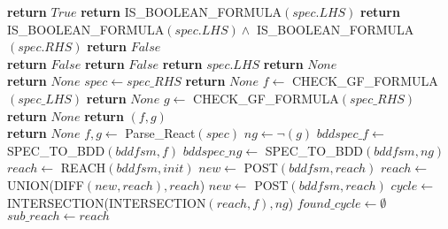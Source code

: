 \documentclass{article}
\begin{document}
\begin{algorithmic}

                 \State \textbf{return }$ True$
      \EndIf  
                 \State \textbf{return } IS\_BOOLEAN\_FORMULA$(spec.LHS)$
      \EndIf 
                 \State \textbf{return } IS\_BOOLEAN\_FORMULA$(spec.LHS) \land $ IS\_BOOLEAN\_FORMULA$(spec.RHS)$
      \EndIf 
      \State \textbf{return }$False$
\EndFunction
\\
                 \State \textbf{return }$ False$
      \EndIf  
                 \State \textbf{return }$ False$
     \EndIf 
             \State \textbf{return }$ spec.LHS$
      \Else
       \State \textbf{return }$ None$
      \EndIf 
\EndFunction
\\
        \State \textbf{return }$ None$
       \EndIf 
  \State $spec \leftarrow spec\_RHS$
        \State \textbf{return }$ None$
       \EndIf  
   \State $f \leftarrow$ CHECK\_GF\_FORMULA$(spec\_LHS)$
        \State \textbf{return }$ None$
       \EndIf  
   \State $g \leftarrow$ CHECK\_GF\_FORMULA$(spec\_RHS)$
        \State \textbf{return }$ None$
       \EndIf  
\State \textbf{return }$ (f, g)$
\EndFunction
\\
        \State \textbf{return }$ None$
\Else
     \State $ f, g \leftarrow $ Parse\_React$(spec)$  
     \State $ng \leftarrow \neg(g)$
     \State $bddspec\_f \leftarrow$ SPEC\_TO\_BDD$(bddfsm, f)$
     \State $bddspec\_ng \leftarrow$ SPEC\_TO\_BDD$(bddfsm, ng)$
     \State $reach \leftarrow$ REACH$(bddfsm, init)$
     \State $new\leftarrow$ POST$(bddfsm, reach)$
           \State $reach\leftarrow$ UNION(DIFF$(new, reach),reach$)
           \State $new\leftarrow$ POST$(bddfsm, reach)$
     \EndWhile
     \State $cycle\leftarrow $INTERSECTION(INTERSECTION$(reach, f),ng$)
     \State $found\_cycle\leftarrow \emptyset$
     \State $sub\_reach\leftarrow reach$

\end{algorithmic}
\end{document}

